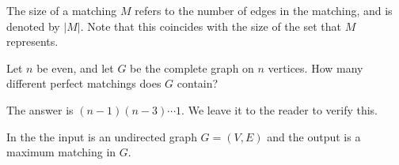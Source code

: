 \begin{note} \label{note:Size-of-a-matching}
The size of a matching $M$ refers to the number of edges in the matching, and is denoted by $|M|$. Note that this coincides with the size of the set that $M$ represents.
\end{note}


\begin{flex}
\begin{exercise} \label{exercise:Number-of-perfect-matchings-in-a-complete-graph}
Let $n$ be even, and let $G$ be the complete graph on $n$ vertices. How many different perfect matchings does $G$ contain?
\end{exercise}

\begin{solution}
The answer is $(n-1)(n-3) \cdots 1$. We leave it to the reader to verify this.
\end{solution}
\end{flex}


\begin{definition} \label{definition:Maximum-matching-problem}
In the  the input is an undirected graph $G=(V,E)$ and the output is a maximum matching in $G$.
\end{definition}


